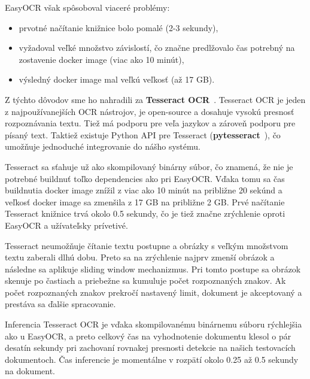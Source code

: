 EasyOCR však spôsoboval viaceré problémy:
\begin{itemize}
    \item prvotné načítanie knižnice bolo pomalé (2-3 sekundy),
    \item vyžadoval veľké množstvo závislostí, čo značne predlžovalo čas potrebný na zostavenie docker image (viac ako 10 minút),
    \item výsledný docker image mal veľkú veľkosť (až 17 GB).
\end{itemize}

Z týchto dôvodov sme ho nahradili za \textbf{Tesseract OCR}~\cite{tesseract}. Tesseract OCR je jeden z najpoužívanejších OCR nástrojov, je open-source a dosahuje vysokú presnosť rozpoznávania textu. Tiež má podporu pre veľa jazykov a zároveň podporu pre písaný text. Taktiež existuje Python API pre Tesseract (\textbf{pytesseract}~\cite{pytesseract}), čo umožňuje jednoduché integrovanie do nášho systému.

Tesseract sa sťahuje už ako skompilovaný binárny súbor, čo znamená, že nie je potrebné buildnuť toľko dependencies ako pri EasyOCR. Vďaka tomu sa čas buildnutia docker image znížil z viac ako 10 minút na približne 20 sekúnd a veľkosť docker image sa zmenšila z 17 GB na približne 2 GB. Prvé načítanie Tesseract knižnice trvá okolo 0.5 sekundy, čo je tiež značne zrýchlenie oproti EasyOCR a užívateľsky prívetivé.

Tesseract neumožňuje čítanie textu postupne a obrázky s veľkým množstvom textu zaberali dlhú dobu. Preto sa na zrýchlenie najprv zmenší obrázok a následne sa aplikuje sliding window mechanizmus. Pri tomto postupe sa obrázok skenuje po častiach a priebežne sa kumuluje počet rozpoznaných znakov. Ak počet rozpoznaných znakov prekročí nastavený limit, dokument je akceptovaný a prestáva sa ďalšie spracovanie.

Inferencia Tesseract OCR je vďaka skompilovanému binárnemu súboru rýchlejšia ako u EasyOCR, a preto celkový čas na vyhodnotenie dokumentu klesol o pár desatín sekundy pri zachovaní rovnakej presnosti detekcie na našich testovacích dokumentoch. Čas inferencie je momentálne v rozpätí okolo 0.25 až 0.5 sekundy na dokument.


